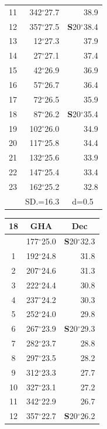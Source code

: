 \documentclass[10pt, a4paper]{report}
\begin{document}
\begin{scriptsize}
\begin{tabular*}{0.2\textwidth}[t]{@{\extracolsep{\fill}}|c|rr|}
11 & 342$^\circ$27.7 & 38.9\\[2Pt]
12 & 357$^\circ$27.5 & \textbf{S}20$^\circ$38.4\\
13 & 12$^\circ$27.3 & 37.9\\
14 & 27$^\circ$27.1 & 37.4\\
15 & 42$^\circ$26.9 & \raisebox{0.24ex}{\boldmath$\cdot$~\boldmath$\cdot$~~}36.9\\
16 & 57$^\circ$26.7 & 36.4\\
17 & 72$^\circ$26.5 & 35.9\\[2Pt]
18 & 87$^\circ$26.2 & \textbf{S}20$^\circ$35.4\\
19 & 102$^\circ$26.0 & 34.9\\
20 & 117$^\circ$25.8 & 34.4\\
21 & 132$^\circ$25.6 & \raisebox{0.24ex}{\boldmath$\cdot$~\boldmath$\cdot$~~}33.9\\
22 & 147$^\circ$25.4 & 33.4\\
23 & 162$^\circ$25.2 & 32.8\\
\hline
\rule{0pt}{2.4ex} & \multicolumn{1}{c}{SD.=16.3} & \multicolumn{1}{c|}{d=0.5}\\
\hline
\end{tabular*}\noindent
\begin{tabular*}{0.2\textwidth}[t]{@{\extracolsep{\fill}}|c|rr|}
\hline
\multicolumn{1}{|c|}{\rule{0pt}{2.6ex}\textbf{18}} & \multicolumn{1}{c}{\textbf{GHA}} & \multicolumn{1}{c|}{\textbf{Dec}}\\
\hline\rule{0pt}{2.6ex}\noindent
0 & 177$^\circ$25.0 & \textbf{S}20$^\circ$32.3\\
1 & 192$^\circ$24.8 & 31.8\\
2 & 207$^\circ$24.6 & 31.3\\
3 & 222$^\circ$24.4 & \raisebox{0.24ex}{\boldmath$\cdot$~\boldmath$\cdot$~~}30.8\\
4 & 237$^\circ$24.2 & 30.3\\
5 & 252$^\circ$24.0 & 29.8\\[2Pt]
6 & 267$^\circ$23.9 & \textbf{S}20$^\circ$29.3\\
7 & 282$^\circ$23.7 & 28.8\\
8 & 297$^\circ$23.5 & 28.2\\
9 & 312$^\circ$23.3 & \raisebox{0.24ex}{\boldmath$\cdot$~\boldmath$\cdot$~~}27.7\\
10 & 327$^\circ$23.1 & 27.2\\
11 & 342$^\circ$22.9 & 26.7\\[2Pt]
12 & 357$^\circ$22.7 & \textbf{S}20$^\circ$26.2\\

\end{tabular*}
\end{scriptsize}
\end{document}
